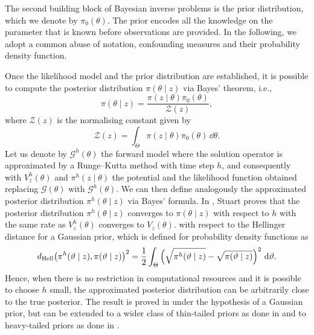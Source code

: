\documentclass[10pt]{article}
\begin{document}
The second building block of Bayesian inverse problems is the prior distribution, which we denote by $\pi_0(\theta)$. The prior encodes all the knowledge on the parameter that is known before observations are provided. In the following, we adopt a common abuse of notation, confounding measures and their probability density function. 

Once the likelihood model and the prior distribution are established, it is possible to compute the posterior distribution $\pi(\theta \mid z)$ via Bayes' theorem, i.e.,
\begin{equation}
	\pi(\theta\mid z) = \frac{\pi(z\mid \theta)\pi_0(\theta)}{\mathcal Z(z)},
\end{equation}
where $\mathcal Z(z)$ is the normalising constant given by
\begin{equation}
	\mathcal Z(z) = \int_{\Theta} \pi(z\mid \theta) \pi_0(\theta) \, \dd \theta.
\end{equation}
Let us denote by $\mathcal{G}^h(\theta)$ the forward model where the solution operator is approximated by a Runge--Kutta method with time step $h$, and consequently with $V^h_z(\theta)$ and $\pi^h(z\mid\theta)$ the potential and the likelihood function obtained replacing $\mathcal{G}(\theta)$ with $\mathcal{G}^h(\theta)$. We can then define analogously the approximated posterior distribution $\pi^h(\theta \mid z)$ via Bayes' formula.  In \cite[Theorem 4.6]{Stu10}, Stuart proves that the posterior distribution $\pi^h(\theta\mid z)$ converges to $\pi(\theta\mid z)$ with respect to $h$ with the same rate as $V^h_z(\theta)$ converges to $V_z(\theta)$.  with respect to the Hellinger distance for a Gaussian prior, which is defined for probability density functions  as
\begin{equation}
	d_{\mathrm{Hell}}\big(\pi^h(\vartheta\mid z), \pi(\vartheta\mid z)\big)^2 = \frac{1}{2}\int_{\Theta} \Big(\sqrt{\pi^h(\vartheta\mid z)} - \sqrt{\pi(\vartheta\mid z)}\Big)^2 \, \,\mathrm{d} \vartheta.
\end{equation}
Hence, when there is no restriction in computational resources and it is possible to choose $h$ small, the approximated posterior distribution can be  arbitrarily close to the true posterior. The result is proved in \cite{Stu10} under the hypothesis of a Gaussian prior, but can be extended to a wider class of thin-tailed priors as done in \cite{DaS16} and to heavy-tailed priors as done in \cite{Sul17}.
\end{document}
